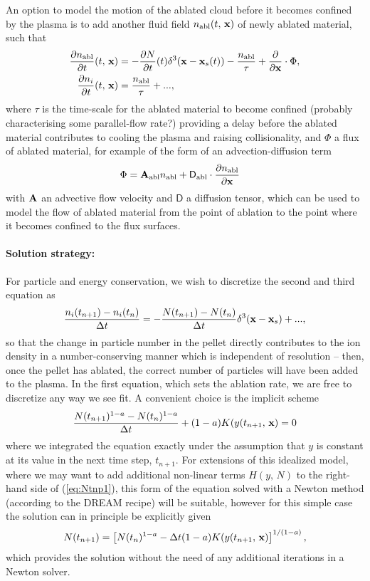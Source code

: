 \documentclass[11pt,a4paper]{article}
\newcommand{\sub}[1]{\ensuremath{_{\text{#1}}}}
\renewcommand{\b}[1]{\ensuremath{ {\bf #1 } }}
\begin{document}
An option to model the motion of the ablated cloud before it becomes confined by the plasma is to add another fluid field $n_\text{abl}(t,\,\b{x})$ of newly ablated material, such that
\begin{align}
\frac{\partial n\sub{abl}}{\partial t}(t,\,\b{x}) &= - \frac{\partial N}{\partial t}(t) \delta^3(\b{x}-\b{x}_s(t)) - \frac{n\sub{abl}}{\tau} + \frac{\partial}{\partial \b{x}}\cdot \Phi, \nonumber \\
\frac{\partial n_i}{\partial t}(t,\,\b{x}) &=  \frac{n\sub{abl}}{\tau} + ... ,
\end{align}
where $\tau$ is the time-scale for the ablated material to become confined (probably characterising some parallel-flow rate?) providing a delay before the ablated material contributes to cooling the plasma and raising collisionality, and $\Phi$ a flux of ablated material, for example of the form of an advection-diffusion term 
\begin{align}
\Phi &= \b{A}\sub{abl} n\sub{abl} + \mathsf{D}\sub{abl}\cdot \frac{\partial n\sub{abl}}{\partial \b{x}}
\end{align}
with \b{A} an advective flow velocity and $\mathsf{D}$ a diffusion tensor, which can be used to model the flow of ablated material from the point of ablation to the point where it becomes confined to the flux surfaces. 

\paragraph{Solution strategy:} For particle and energy conservation, we wish to discretize the second and third equation as 
\begin{align}
\frac{n_i(t_{n+1}) - n_i(t_n)}{\Delta t} = -\frac{N(t_{n+1}) - N(t_n)}{\Delta t}\delta^3(\b{x}-\b{x}_s) + ...,
\end{align}
so that the change in particle number in the pellet directly contributes to the ion density in a number-conserving manner which is independent of resolution -- then, once the pellet has ablated, the correct number of particles will have been added to the plasma. In the first equation, which sets the ablation rate, we are free to discretize any way we see fit. A convenient choice is the implicit scheme
\begin{align}
\frac{N(t_{n+1})^{1-a} - N(t_n)^{1-a}}{\Delta t} + (1-a)K(y(t_{n+1},\,\b{x}) = 0
\label{eq:Ntnp1}
\end{align}
where we integrated the equation exactly under the assumption that $y$ is constant at its value in the next time step, $t_{n+1}$. For extensions of this idealized model, where we may want to add additional non-linear terms $H(y,\,N)$ to the right-hand side of (\ref{eq:Ntnp1}), this form of the equation solved with a Newton method (according to the DREAM recipe) will be suitable, however for this simple case the solution can in principle be explicitly given 
\begin{align}
N(t_{n+1}) = \left[ N(t_n)^{1-a} - \Delta t (1-a)K(y(t_{n+1},\,\b{x})  \right]^{1/(1-a)},
\end{align}
which provides the solution without the need of any additional iterations in a Newton solver.
\end{document}
